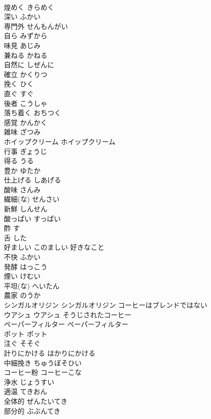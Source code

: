 \documentclass[8pt]{extreport}
\begin{document}
\begin{CJK}{UTF8}{min}
\\	煌めく	きらめく	
\\	深い	ふかい	
\\	専門外	せんもんがい	
\\	自ら	みずから	
\\	味見	あじみ	
\\	兼ねる	かねる	
\\	自然に	しぜんに	
\\	確立	かくりつ	
\\	挽く	ひく	
\\	直ぐ	すぐ	
\\	後者	こうしゃ	
\\	落ち着く	おちつく	
\\	感覚	かんかく	
\\	雑味	ざつみ	
\\	ホイップクリーム	ホイップクリーム	
\\	行事	ぎょうじ	
\\	得る	うる	
\\	豊か	ゆたか	
\\	仕上げる	しあげる	
\\	酸味	さんみ	
\\	繊細(な)	せんさい	
\\	新鮮	しんせん	
\\	酸っぱい	すっぱい	
\\	酢	す	
\\	舌	した	
\\	好ましい	このましい	好きなこと
\\	不快	ふかい	
\\	発酵	はっこう	
\\	煙い	けむい	
\\	平坦(な)	へいたん	
\\	農家	のうか	
\\	シンガルオリジン	シンガルオリジン	コーヒーはブレンドではない
\\	ウアシュ	ウアシュ	そうじされたコーヒー
\\	ペーパーフィルター	ペーパーフィルター	
\\	ポット	ポット	
\\	注ぐ	そそぐ	
\\	計りにかける	はかりにかける	
\\	中細挽き	ちゅうぼそひい	
\\	コーヒー粉	コーヒーこな	
\\	浄水	じょうすい	
\\	適温	てきおん	
\\	全体的	ぜんたいてき	
\\	部分的	ぶぶんてき	

\end{CJK}
\end{document}
